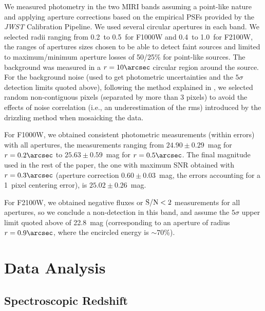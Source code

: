 \documentclass[twocolumn]{aastex7}
\begin{document}
We measured photometry in the two MIRI bands assuming a point-like nature and applying aperture corrections based on the empirical PSFs provided by the \textit{JWST} Calibration Pipeline. We used several circular apertures in each band. We selected radii ranging from 0.2\arcsec\,  to 0.5\arcsec\, for F1000W and 0.4\arcsec\, to 1.0\arcsec\, for F2100W, the ranges of apertures sizes chosen to be able to detect faint sources and limited to maximum/minimum aperture losses of 50/25\% for point-like sources.  The background was measured in a $r=10\arcsec$ circular region around the source. For the background noise (used to get photometric uncertainties and the $5\sigma$ detection limits quoted above), following the method explained in \citet[][based on \citealt{2008ApJ...675..234P}]{2023ApJ...951L...1P},
we selected random non-contiguous pixels (separated by more than 3 pixels) to avoid the effects of noise correlation (i.e., an underestimation of the rms) introduced by the drizzling method when mosaicking the data.

For F1000W, we obtained consistent photometric measurements (within errors) with all apertures, the measurements ranging from $24.90\pm0.29$~mag for $r=0.2\arcsec$ to $25.63\pm0.59$~mag for $r=0.5\arcsec$. The final magnitude used in the rest of the paper, the one with maximum SNR obtained with $r=0.3\arcsec$ (aperture correction $0.60\pm0.03$~mag, the errors accounting for a 1~pixel centering error), is $25.02\pm0.26$~mag. 

For F2100W, we obtained negative fluxes or ${\rm S/N}<2$ measurements for all apertures, so we conclude a non-detection in this band, and  assume the $5\sigma$ upper limit quoted above of 22.8~mag (corresponding to an aperture of radius $r=0.9\arcsec$, where the encircled energy is $\sim70$\%).

\section{Data Analysis}\label{sec:analysis}
\subsection{Spectroscopic Redshift}\label{sec:redshift}
\end{document}
